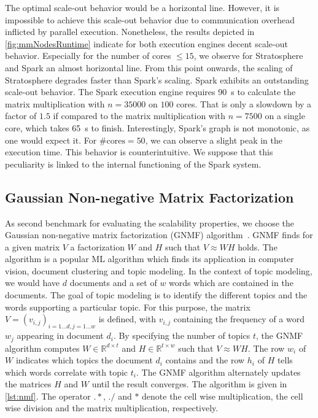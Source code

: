 The optimal scale-out behavior would be a horizontal line.
However, it is impossible to achieve this scale-out behavior due to communication overhead inflicted by parallel execution.
Nonetheless, the results depicted in \cref{fig:mmNodesRuntime} indicate for both execution engines decent scale-out behavior.
Especially for the number of cores $\le 15$, we observe for Stratosphere and Spark an almost horizontal line.
From this point onwards, the scaling of Stratosphere degrades faster than Spark's scaling.
Spark exhibits an outstanding scale-out behavior.
The Spark execution engine requires \SI{90}{\second} to calculate the matrix multiplication with $n=35000$ on $100$ cores.
That is only a slowdown by a factor of $1.5$ if compared to the matrix multiplication with $n=7500$ on a single core, which takes \SI{65}{\second} to finish.
Interestingly, Spark's graph is not monotonic, as one would expect it.
For $\text{\#cores}=50$, we can observe a slight peak in the execution time.
This behavior is counterintuitive.
We suppose that this peculiarity is linked to the internal functioning of the Spark system.

\subsection{Gaussian Non-negative Matrix Factorization}
\label{subsec:NMF}

As second benchmark for evaluating the scalability properties, we choose the Gaussian non-negative matrix factorization (GNMF) algorithm~\cite{seung:anips2001a}.
GNMF finds for a given matrix $V$ a factorization $W$ and $H$ such that $V\approx W H$ holds.
The algorithm is a popular ML algorithm which finds its application in computer vision, document clustering and topic modeling.
In the context of topic modeling, we would have $d$ documents and a set of $w$ words which are contained in the documents.
The goal of topic modeling is to identify the different topics and the words supporting a particular topic.
For this purpose, the matrix $V = (v_{i,j})_{i=1\ldots d,j=1\ldots w}$ is defined, with $v_{i,j}$ containing the frequency of a word $w_j$ appearing in document $d_i$.
By specifying the number of topics $t$, the GNMF algorithm computes $W\in \mathbb{R}^{d\times t}$ and $H\in \mathbb{R}^{t\times w}$ such that $V \approx W H$.
The row $w_i$ of $W$ indicates which topics the document $d_i$ contains and the row $h_i$ of $H$ tells which words correlate with topic $t_i$.
The GNMF algorithm alternately updates the matrices $H$ and $W$ until the result converges.
The algorithm is given in \cref{lst:nmf}.
The operator $.*$, $./$ and $*$ denote the cell wise multiplication, the cell wise division and the matrix multiplication, respectively.

